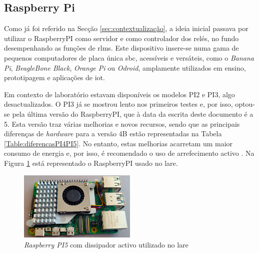 \subsection{Raspberry Pi}
\label{sec:RaspberryPI}
Como já foi referido na Secção \ref{sec:contextualização}, a ideia inicial passava por utilizar o \gls{RaspberryPI} como servidor e como controlador dos relés, no fundo desempenhando as funções de \acrshort{rlms}. Este dispositivo insere-se numa gama de pequenos computadores de placa única \gls{sbc}, acessíveis e versáteis, como o \textit{Banana Pi}, \textit{BeagleBone Black}, \textit{Orange Pi} ou \textit{Odroid}, amplamente utilizados em ensino, prototipagem e aplicações de \acrshort{iot}. 

Em contexto de laboratório estavam disponíveis os modelos PI2 e PI3, algo desactualizados. O PI3 já se mostrou lento nos primeiros testes e, por isso, optou-se pela última versão do \gls{RaspberryPI}, que à data da escrita deste documento é a 5. Esta versão traz várias melhorias e novos recursos, sendo que as principais diferenças de \textit{hardware} para a versão 4B estão representadas na Tabela \ref{Table:diferencasPI4PI5}. No entanto, estas melhorias acarretam um maior consumo de energia e, por isso, é recomendado o uso de arrefecimento activo \cite{Raspberrytech}. Na Figura \ref{fig:pi5dissipador} está representado o \gls{RaspberryPI} usado no \acrshort{lare}.

\begin{figure}[hbtp]
    \centering
    \includegraphics[width=0.5\textwidth]{figures/pi5_dissipador.png}
    \caption{\textit{Raspberry PI5} com dissipador activo utilizado no \acrshort{lare}}
    \label{fig:pi5dissipador}
\end{figure}

